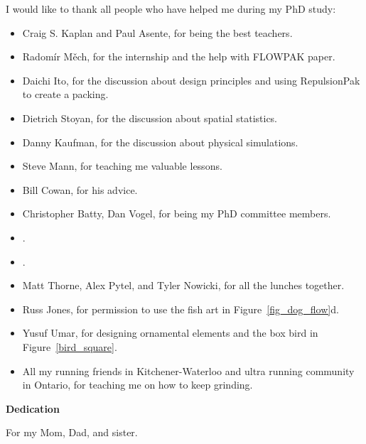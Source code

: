 I would like to thank all people who have helped me during my PhD study:


\begin{itemize}  
\item Craig S. Kaplan and Paul Asente, for being the best teachers.
\item Radom\'ir M\v{e}ch, for the internship and the help with FLOWPAK paper. 
\item Daichi Ito, for the discussion about design principles and using RepulsionPak to create a packing.
\item Dietrich Stoyan, for the discussion about spatial statistics.
\item Danny Kaufman, for the discussion about physical simulations.
\item Steve Mann, for teaching me valuable lessons.
\item Bill Cowan, for his advice.
\item Christopher Batty, Dan Vogel, for being my PhD committee members.
\item {}.
\item {}.
\item Matt Thorne, Alex Pytel, and Tyler Nowicki, for all the lunches together. 
\item Russ Jones, for permission to use the fish art in Figure~\ref{fig_dog_flow}d.
\item Yusuf Umar, for designing ornamental elements and the box bird in Figure~\ref{bird_square}.
\item All my running friends in Kitchener-Waterloo and ultra running community in \mbox{Ontario}, 
for teaching me on how to keep grinding.
\end{itemize}

\cleardoublepage


\begin{center}\textbf{Dedication}\end{center}

For my Mom, Dad, and sister.
\cleardoublepage

\renewcommand\contentsname{Table of Contents}
\tableofcontents
\cleardoublepage
{}    %

\listoftables
\cleardoublepage
{}		%

